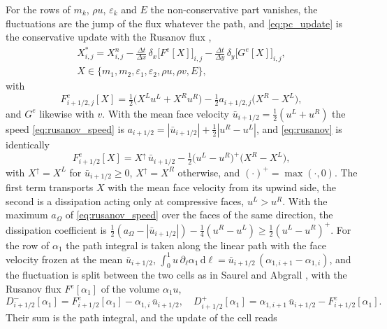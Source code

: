 For the rows of $m_k$, $\rho u$, $\varepsilon_k$ and $E$ the non-conservative part vanishes, the fluctuations are the jump of the flux
whatever the path, and \eqref{eq:pc_update} is the conservative update with the Rusanov flux
\cite{Rusanov1961},
\begin{equation}
\begin{gathered}
X^*_{i,j}=X^n_{i,j}-\frac{\Delta t}{\Delta x}\,\delta_x\big[F^e[X]\big]_{i,j}-\frac{\Delta t}{\Delta y}\,\delta_y\big[G^e[X]\big]_{i,j},\\
X\in\{m_1,m_2,\varepsilon_1,\varepsilon_2,\rho u,\rho v,E\},
\end{gathered}
\label{eq:explicit}
\end{equation}
with
\begin{equation}
F^e_{i+1/2,j}[X]=\tfrac12\big(X^Lu^L+X^Ru^R\big)-\tfrac12a_{i+1/2,j}\big(X^R-X^L\big),
\label{eq:rusanov}
\end{equation}
and $G^e$ likewise with $v$. With the mean face velocity $\bar u_{i+1/2}=\tfrac12(u^L+u^R)$ the speed \eqref{eq:rusanov_speed} is
$a_{i+1/2}=|\bar u_{i+1/2}|+\tfrac12|u^R-u^L|$, and \eqref{eq:rusanov} is identically
\begin{equation}
F^e_{i+1/2}[X]=X^{\uparrow}\,\bar u_{i+1/2}-\tfrac12\big(u^L-u^R\big)^+\big(X^R-X^L\big),
\label{eq:rusanov_upwind}
\end{equation}
with $X^\uparrow=X^L$ for $\bar u_{i+1/2}\ge0$, $X^\uparrow=X^R$ otherwise, and $(\cdot)^+=\max(\cdot,0)$. The first term transports $X$ with the mean face velocity
from its upwind side, the second is a dissipation acting only at compressive faces, $u^L>u^R$. With the maximum $a_\Omega$ of
\eqref{eq:rusanov_speed} over the faces of the same direction, the dissipation coefficient is
$\tfrac12(a_\Omega-|\bar u_{i+1/2}|)-\tfrac14(u^R-u^L)\ge\tfrac12(u^L-u^R)^+$.
For the row of $\alpha_1$ the path integral is taken along the linear path with the face velocity frozen at the mean
$\bar u_{i+1/2}$, $\int_0^1u\,\partial_\ell\alpha_1\,\mathrm d\ell=\bar u_{i+1/2}\,(\alpha_{1,i+1}-\alpha_{1,i})$, and the fluctuation is split
between the two cells as in Saurel and Abgrall \cite{SaurelAbgrall1999a}, with the Rusanov flux $F^e[\alpha_1]$ of the volume
$\alpha_1u$,
\begin{equation}
D^-_{i+1/2}[\alpha_1]=F^e_{i+1/2}[\alpha_1]-\alpha_{1,i}\,\bar u_{i+1/2},\quad
D^+_{i+1/2}[\alpha_1]=\alpha_{1,i+1}\,\bar u_{i+1/2}-F^e_{i+1/2}[\alpha_1].
\label{eq:pc_rusanov}
\end{equation}
Their sum is the path integral, and the update of the cell reads
